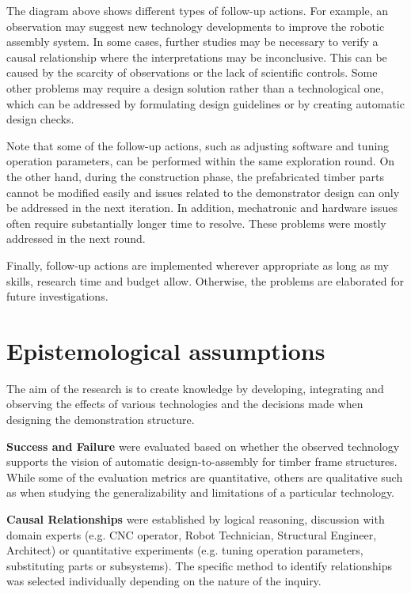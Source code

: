The diagram above shows different types of follow-up actions. For example, an observation may suggest new technology developments to improve the robotic assembly system. In some cases, further studies may be necessary to verify a causal relationship where the interpretations may be inconclusive. This can be caused by the scarcity of observations or the lack of scientific controls. Some other problems may require a design solution rather than a technological one, which can be addressed by formulating design guidelines or by creating automatic design checks. 

Note that some of the follow-up actions, such as adjusting software and tuning operation parameters, can be performed within the same exploration round. On the other hand, during the construction phase, the prefabricated timber parts cannot be modified easily and issues related to the demonstrator design can only be addressed in the next iteration. In addition, mechatronic and hardware issues often require substantially longer time to resolve. These problems were mostly addressed in the next round. 

Finally, follow-up actions are implemented wherever appropriate as long as my skills, research time and budget allow. Otherwise, the problems are elaborated for future investigations. 

\section{Epistemological assumptions}
\label{section:methodology-epistemological-assumptions}

The aim of the research is to create knowledge by developing, integrating and observing the effects of various technologies and the decisions made when designing the demonstration structure.

\textbf{Success and Failure} were evaluated based on whether the observed technology supports the vision of automatic design-to-assembly for timber frame structures. While some of the evaluation metrics are quantitative, others are qualitative such as when studying the generalizability and limitations of a particular technology.

\textbf{Causal Relationships} were established by logical reasoning, discussion with domain experts (e.g. CNC operator, Robot Technician, Structural Engineer, Architect) or quantitative experiments (e.g. tuning operation parameters, substituting parts or subsystems). The specific method to identify relationships was selected individually depending on the nature of the inquiry.

